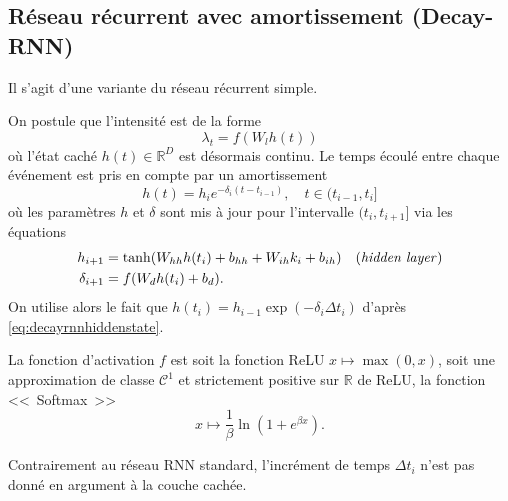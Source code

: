 \documentclass[11pt]{article}
\newcommand{\RR}{\mathbb{R}}
\begin{document}
\subsection{Réseau récurrent avec amortissement (Decay-RNN)}

Il s'agit d'une variante du réseau récurrent simple.

On postule que l'intensité est de la forme
\begin{equation}\label{eq:decayrnnhiddenstate}
	\lambda_t = f(W_l h(t))
\end{equation}
où l'état caché $h(t)\in\RR^D$ est désormais continu. Le temps écoulé entre chaque événement est pris en compte par un amortissement
\begin{equation}
	h(t) = h_{i}e^{-\delta_i(t-t_{i-1})},\quad t\in(t_{i-1},t_i]
\end{equation}
où les paramètres $h$ et $\delta$ sont mis à jour pour l'intervalle $(t_i,t_{i+1}]$ via les équations
\begin{subequations}
\begin{align}
h_{i+1} &= \tanh(W_{hh}h(t_i) + b_{hh} + W_{ih}k_i + b_{ih})\quad\text{(\textit{hidden layer})} \\
\delta_{i+1} &= f(W_dh(t_i) + b_d).
\end{align}
\end{subequations}
On utilise alors le fait que $h(t_i) = h_{i-1}\exp(-\delta_i\Delta t_i)$ d'après \eqref{eq:decayrnnhiddenstate}.

La fonction d'activation $f$ est soit la fonction ReLU $x\mapsto \max(0,x)$, soit une approximation de classe $\mathcal C^1$ et strictement positive sur $\RR$ de ReLU, la fonction <<~Softmax~>>
\[
	x\mapsto \frac{1}{\beta}\ln(1+e^{\beta x}).
\]

Contrairement au réseau RNN standard, l'incrément de temps $\Delta t_i$ n'est pas donné en argument à la couche cachée.
\end{document}
